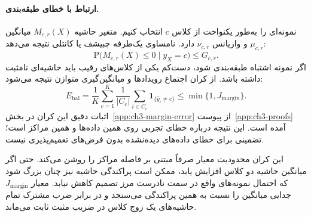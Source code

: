 \paragraph{ارتباط با خطای طبقه‌بندی.}
نمونه‌ای را به‌طور یکنواخت از کلاس $c$ انتخاب کنیم. متغیر حاشیه $M_{c,r}(X)$ میانگین $\mu_{c,r}$ و واریانس $\nu_{c,r}$ دارد. نامساوی یک‌طرفه چبیشف یا کانتلی نتیجه می‌دهد:
\begin{equation}\label{eq:ch3-margin-Cantelli}
\mathrm P\bigl(M_{c,r}(X)\le0\mid y_X=c\bigr)
\le G_{c,r}.
\end{equation}
اگر نمونه اشتباه طبقه‌بندی شود، دست‌کم یکی از کلاس‌های رقیب باید حاشیه‌ای نامثبت داشته باشد. از کران اجتماع رویدادها و میانگین‌گیری متوازن نتیجه می‌شود:
\begin{equation}\label{eq:ch3-margin-error-bound}
\boxed{
E_{\mathrm{bal}}
=\frac1K\sum_{c=1}^{K}\frac1{|C_c|}
\sum_{i\in C_c}\mathbf1_{\{\widehat y_i\ne c\}}
\le\min\{1,J_{\mathrm{margin}}\}.}
\end{equation}
اثبات دقیق این کران در بخش~\ref{app:ch3-margin-error} از پیوست~\ref{app:ch3-proofs} آمده است. این نتیجه درباره خطای تجربی روی همین داده‌ها و همین مراکز است؛ تضمینی برای خطای داده‌های دیده‌نشده بدون فرض‌های تعمیم‌پذیری نیست.

این کران محدودیت معیار صرفاً مبتنی بر فاصله مراکز را روشن می‌کند. حتی اگر میانگین حاشیه دو کلاس افزایش یابد، ممکن است پراکندگی حاشیه نیز چنان بزرگ شود که احتمال نمونه‌های واقع در سمت نادرست مرز تصمیم کاهش نیابد. معیار $J_{\mathrm{margin}}$ جدایی میانگین را نسبت به همین پراکندگی می‌سنجد و در برابر ضرب مشترک تمام حاشیه‌های یک زوج کلاس در ضریب مثبت ثابت می‌ماند.



